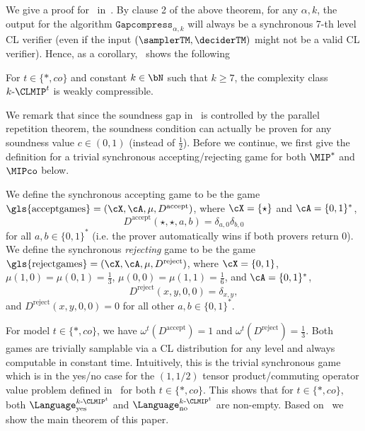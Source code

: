 We give a proof for~ in~. By clause 2 of the above theorem, for any $\alpha, k$, the output for the algorithm $\texttt{Gapcompress}_{\alpha, k}$ will always be a synchronous 7-th level CL verifier (even if the input $(\samplerTM, \deciderTM)$ might not be a valid CL verifier). Hence, as a corollary,~ shows the following
\begin{corollary} \label{cor:KMIPcomp}
	For $t \in \{*, co\}$ and constant $k \in \bN$ such that $k \geq 7$, the complexity class $k\text{-}\CLMIP^t$ is weakly compressible.
\end{corollary}
We remark that since the soundness gap in~ is controlled by the parallel repetition theorem, the soundness condition can actually be proven for any soundness value $c \in (0,1)$ (instead of $\frac{1}{2}$). Before we continue, we first give the definition for a trivial synchronous accepting/rejecting game for both $\MIP^*$ and $\MIPco$ below.  
\begin{definition} \label{def:syncrejgame}
	We define the synchronous accepting game to be the game $\text{\gls{acceptgames}} = (\cX, \cA, \mu, D^{\text{accept}})$, where $\cX= \{\star\}$ and $\cA = \{0,1\}^*$, 
	\begin{equation*}
		D^{\text{accept}}(\star,\star, a,b) = \delta_{a,0} \delta_{b,0}
	\end{equation*}
	for all $a,b \in \{0,1\}^*$ (i.e. the prover automatically wins if both provers return 0). We define the synchronous \textit{rejecting} game to be the game $\text{\gls{rejectgames}} = (\cX, \cA, \mu, D^{\text{reject}})$, where $\cX= \{0,1\}$, $\mu(1,0) =\mu(0,1) =  \frac{1}{3}$, $\mu(0,0)  = \mu(1,1) = \frac{1}{6}$, and $\cA = \{0,1\}^*$, 
	\begin{equation*}
		D^{\text{reject}}(x,y, 0,0) = \delta_{x,y},
	\end{equation*}
	and $D^{\text{reject}}(x,y, 0,0) = 0$ for all other $a,b \in \{0,1\}^*$.
\end{definition}

For model $t \in \{*, co\}$, we have $\omega^{t}(D^{\text{accept}}) =1$ and $\omega^{t}(D^{\text{reject}}) = \frac{1}{3}$. Both games are trivially samplable via a CL distribution for any level and always computable in constant time. Intuitively, this is the trivial synchronous game which is in the yes/no case for the $(1,1/2)$ tensor product/commuting operator value problem defined in~ for both $t \in \{*, co\}$. This shows that for $t \in  \{*, co\}$, both $\Language^{k\text{-}\CLMIP^t}_{\text{yes}}$ and $\Language^{k\text{-}\CLMIP^t}_{\text{no}}$ are non-empty. Based on~ we show the main theorem of this paper. 

